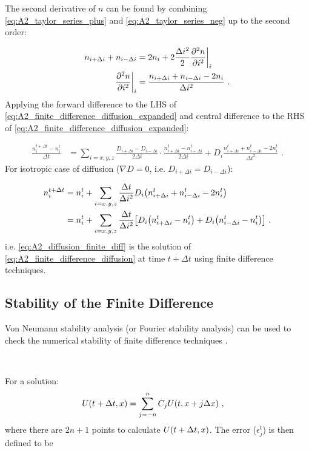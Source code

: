 The second derivative of $n$ can be found by combining \autoref{eq:A2_taylor_series_plus} and \autoref{eq:A2_taylor_series_neg} up to the second order:

\begin{equation}
    \begin{aligned}
        n_{i+\Delta i}+n_{i-\Delta i} &=2n_{i} + 2\frac{\Delta i^2}{2}\pdv[2]{n}{i}\bigg|_{i} \\
        \pdv[2]{n}{i} \bigg|_{i}&=\frac{n_{i+\Delta i}+n_{i-\Delta i}-2n_i}{\Delta i^2}\text{ .} 
    \end{aligned}
\end{equation}
\noindent Applying the forward difference to the LHS of \autoref{eq:A2_finite_difference_diffusion_expanded} and central difference to the RHS of \autoref{eq:A2_finite_difference_diffusion_expanded}:

\begin{equation}
    \begin{aligned}
    \frac{n_i^{t+\Delta t}-n_i^t}{\Delta t}&=\sum_{i=x,y,z}\frac{D_{i+\Delta i}-D_{i-\Delta i}}{2\Delta i}\cdot \frac{n_{i+\Delta i}^t-n_{i-\Delta i}^t}{2\Delta i}+D_i\frac{n_{i+\Delta i}^t+n_{i-\Delta i}^t-2n_i^t}{\Delta i^2}\text{ .} 
    \end{aligned}
\end{equation}
\noindent For isotropic case of diffusion ($\nabla D=0$, i.e. $D_{i+\Delta i}=D_{i-\Delta i}$):

\begin{equation}
    \begin{aligned}
    n_i^{t+\Delta t}&=n_i^t+\sum_{i=x,y,z}\frac{\Delta t}{\Delta i^2}D_i\qty(n_{i+\Delta i}^t+n_{i-\Delta i}^t-2n_i^t) \\
    &=n_i^t+\sum_{i=x,y,z} \frac{\Delta t}{\Delta i^2}\qty[D_i\qty(n_{i+\Delta i}^t-n_i^t)+D_i\qty(n_{i-\Delta i}^t-n_i^t)]\text{ .} 
    \end{aligned} \label{eq:A2_diffusion_finite_diff}
\end{equation}
\noindent i.e. \autoref{eq:A2_diffusion_finite_diff} is the solution of \autoref{eq:A2_finite_difference_diffusion} at time $t+\Delta t$ using finite difference techniques.

\subsection{Stability of the Finite Difference} \label{sec:A2_finite_stability}

Von Neumann stability analysis (or Fourier stability analysis) can be used to check the numerical stability of finite difference techniques \citep{alma9929637001811}.
\par~\par 
For a solution:
\begin{equation}
    \begin{aligned}
        U\qty(t+\Delta t, x)&=\sum_{j=-n}^n C_j U\qty(t,x+j\Delta x)\text{ ,} 
    \end{aligned} \label{eq:A3_von_newmann_example}
\end{equation}
\noindent where there are $2n+1$ points to calculate $U\qty(t+\Delta t, x)$. The error ($\epsilon_j^t$) is then defined to be

